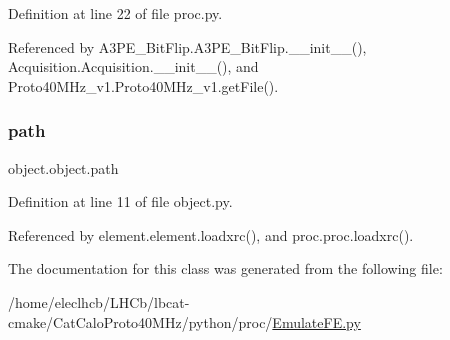 Definition at line 22 of file proc.\+py.



Referenced by A3\+P\+E\+\_\+\+Bit\+Flip.\+A3\+P\+E\+\_\+\+Bit\+Flip.\+\_\+\+\_\+init\+\_\+\+\_\+(), Acquisition.\+Acquisition.\+\_\+\+\_\+init\+\_\+\+\_\+(), and Proto40\+M\+Hz\+\_\+v1.\+Proto40\+M\+Hz\+\_\+v1.\+get\+File().

\mbox{\label{classobject_1_1object_a2a518f960961d791b0f900a90c3cd287}} 
\subsubsection{\texorpdfstring{path}{path}}
{\footnotesize\ttfamily object.\+object.\+path\hspace{0.3cm}{\ttfamily [inherited]}}



Definition at line 11 of file object.\+py.



Referenced by element.\+element.\+loadxrc(), and proc.\+proc.\+loadxrc().



The documentation for this class was generated from the following file\+:\begin{DoxyCompactItemize}
\item 
/home/eleclhcb/\+L\+H\+Cb/lbcat-\/cmake/\+Cat\+Calo\+Proto40\+M\+Hz/python/proc/\hyperlink{EmulateFE_8py}{Emulate\+F\+E.\+py}\end{DoxyCompactItemize}
